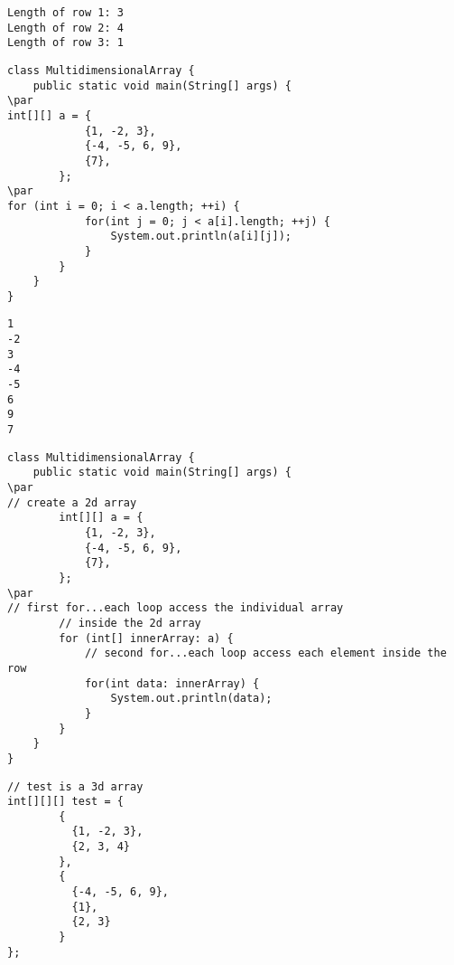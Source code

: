 \documentclass{book}
\def\lthtmlcheckvsize{\ifdim\ht\sizebox<\vsize 
  \ifdim\wd\sizebox<\hsize\expandafter\hfill\fi \expandafter\vfill
  \else\expandafter\vss\fi}%
\begin{document}
{\newpage\clearpage
{}%
\begin{lstlisting}
Length of row 1: 3
Length of row 2: 4
Length of row 3: 1
\end{lstlisting}%
\lthtmlfigureZ
\lthtmlcheckvsize\clearpage}

{\newpage\clearpage
{}%
\begin{lstlisting}
class MultidimensionalArray {
    public static void main(String[] args) {
\par
int[][] a = {
            {1, -2, 3}, 
            {-4, -5, 6, 9}, 
            {7}, 
        };
\par
for (int i = 0; i < a.length; ++i) {
            for(int j = 0; j < a[i].length; ++j) {
                System.out.println(a[i][j]);
            }
        }
    }
}
\end{lstlisting}%
\lthtmlfigureZ
\lthtmlcheckvsize\clearpage}

{\newpage\clearpage
{}%
\begin{lstlisting}
1
-2
3
-4
-5
6
9
7
\end{lstlisting}%
\lthtmlfigureZ
\lthtmlcheckvsize\clearpage}

{\newpage\clearpage
{}%
\begin{lstlisting}
class MultidimensionalArray {
    public static void main(String[] args) {
\par
// create a 2d array
        int[][] a = {
            {1, -2, 3}, 
            {-4, -5, 6, 9}, 
            {7}, 
        };
\par
// first for...each loop access the individual array
        // inside the 2d array
        for (int[] innerArray: a) {
            // second for...each loop access each element inside the row
            for(int data: innerArray) {
                System.out.println(data);
            }
        }
    }
}
\end{lstlisting}%
\lthtmlfigureZ
\lthtmlcheckvsize\clearpage}

{\newpage\clearpage
{}%
\begin{lstlisting}
// test is a 3d array
int[][][] test = {
        {
          {1, -2, 3}, 
          {2, 3, 4}
        }, 
        { 
          {-4, -5, 6, 9}, 
          {1}, 
          {2, 3}
        } 
};
\end{lstlisting}%
\lthtmlfigureZ
\lthtmlcheckvsize\clearpage}
\end{document}
